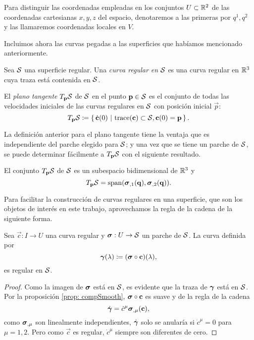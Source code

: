 Para distinguir las coordenadas empleadas en los conjuntos $U \subset \mathbb R^2$ de las coordenadas cartesianas $x, y, z$ del espacio, denotaremos a las primeras por $q^1, q^2$ y las llamaremos coordenadas locales en $V$.

Incluimos ahora las curvas pegadas a las superficies que habíamos mencionado anteriormente.
\begin{definition}
	Sea $\mathcal S$ una superficie regular. Una \emph{curva regular en} $\mathcal S$ es una curva regular en $\mathbb R^3$ cuya traza está contenida en $\mathcal S$.
	
	El \emph{plano tangente} $T_{\mathbf p}\mathcal S$ de $\mathcal S$ en el punto $\mathbf p \in \mathcal S$ es el conjunto de todas las velocidades iniciales de las curvas regulares en $\mathcal S$ con posición inicial $\vec p$:
	\begin{equation}
		T_{\mathbf p}\mathcal S \coloneqq \set{\dot{\mathbf c}(0) \ \rvert \ \mathrm{trace}(\mathbf c) \subset \mathcal S, \mathbf c(0) = \mathbf p}.
	\end{equation}
\end{definition}

La definición anterior para el plano tangente tiene la ventaja que es independiente del parche elegido para $\mathcal S$; y una vez que se tiene un parche de $\mathcal S$, se puede determinar fácilmente a $T_{\mathbf p}\mathcal S$ con el siguiente resultado.
\begin{lemma}
	El conjunto $T_{\mathbf p}\mathcal S$ de $\mathcal S$ es un subespacio bidimensional de $\mathbb R^3$ y
	\begin{equation}
		T_{\mathbf p}\mathcal S = \operatorname{span}(\boldsymbol{\sigma}_{,1}(\mathbf q), \boldsymbol{\sigma}_{,2}(\mathbf q)).
	\end{equation}
\end{lemma}

Para facilitar la construcción de curvas regulares en una superficie, que son los objetos de interés en este trabajo, aprovechamos la regla de la cadena de la siguiente forma.
\begin{proposition}
	Sea $\vec c : I \to U$ una curva regular y $\boldsymbol{\sigma}: U \to \mathcal S$ un parche de $\mathcal S$. La curva definida por
	\begin{equation}\label{eq: gcurve}
		\boldsymbol{\gamma}(\lambda) \coloneqq (\boldsymbol{\sigma} \circ \mathbf c)(\lambda),
	\end{equation}
	es regular en $\mathcal S$.
\end{proposition}
\begin{proof}
	Como la imagen de $\boldsymbol{\sigma}$ está en $\mathcal S$, es evidente que la traza de $\boldsymbol{\gamma}$ está en $\mathcal S$. Por la proposición \ref{prop: compSmooth}, $\boldsymbol{\sigma} \circ \mathbf c$ es suave y de la regla de la cadena
	\begin{equation}
		\dot {\boldsymbol{\gamma}} = \dot c^\mu \boldsymbol{\sigma}_{,\mu}(\mathbf c),
	\end{equation}
	como $\boldsymbol{\sigma}_{,\mu}$ son linealmente independientes, $\dot {\boldsymbol{\gamma}}$ solo se anularía si $\dot c^\mu = 0$ para $\mu = 1, 2$. Pero como $\vec c$ es regular, $\dot c^\mu$ siempre son diferentes de cero.
\end{proof}

